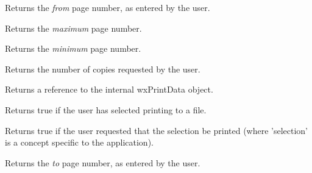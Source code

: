 \label{wxprintdialogdatagetfrompage}


Returns the {\it from} page number, as entered by the user.


\label{wxprintdialogdatagetmaxpage}


Returns the {\it maximum} page number.


\label{wxprintdialogdatagetminpage}


Returns the {\it minimum} page number.


\label{wxprintdialogdatagetnocopies}


Returns the number of copies requested by the user.


\label{wxprintdialogdatagetprintdata}


Returns a reference to the internal wxPrintData object.


\label{wxprintdialogdatagetprinttofile}


Returns true if the user has selected printing to a file.


\label{wxprintdialogdatagetselection}


Returns true if the user requested that the selection be printed (where 'selection' is
a concept specific to the application).


\label{wxprintdialogdatagettopage}


Returns the {\it to} page number, as entered by the user.


\label{wxprintdialogdataisok}


